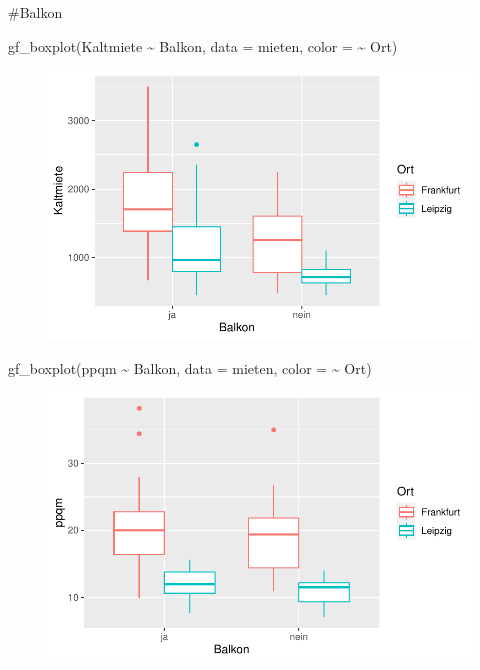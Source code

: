 \documentclass[
  a4paper,
  DIV=11]{scrartcl}
\newenvironment{Shaded}{\begin{snugshade}}{\end{snugshade}}
\newcommand{\AttributeTok}[1]{\textcolor[rgb]{0.40,0.45,0.13}{#1}}
\newcommand{\FunctionTok}[1]{\textcolor[rgb]{0.28,0.35,0.67}{#1}}
\newcommand{\NormalTok}[1]{\textcolor[rgb]{0.00,0.23,0.31}{#1}}
\newcommand{\SpecialCharTok}[1]{\textcolor[rgb]{0.37,0.37,0.37}{#1}}
\begin{document}
\#Balkon

\begin{Shaded}
\begin{Highlighting}[]
\FunctionTok{gf\_boxplot}\NormalTok{(Kaltmiete }\SpecialCharTok{\textasciitilde{}}\NormalTok{ Balkon, }\AttributeTok{data =}\NormalTok{ mieten, }\AttributeTok{color =} \SpecialCharTok{\textasciitilde{}}\NormalTok{ Ort)}
\end{Highlighting}
\end{Shaded}

\begin{figure}[H]

{\centering \includegraphics{Mietmodellierung_files/figure-pdf/unnamed-chunk-13-1.pdf}

}

\end{figure}

\begin{Shaded}
\begin{Highlighting}[]
\FunctionTok{gf\_boxplot}\NormalTok{(ppqm }\SpecialCharTok{\textasciitilde{}}\NormalTok{ Balkon, }\AttributeTok{data =}\NormalTok{ mieten, }\AttributeTok{color =} \SpecialCharTok{\textasciitilde{}}\NormalTok{ Ort)}
\end{Highlighting}
\end{Shaded}

\begin{figure}[H]

{\centering \includegraphics{Mietmodellierung_files/figure-pdf/unnamed-chunk-13-2.pdf}

}

\end{figure}
\end{document}
